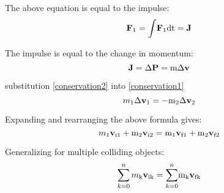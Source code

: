 \documentclass[12pt]{article}
\begin{document}
\noindent
The above equation is equal to the impulse:
\begin{equation*}
\bf{ F}_\text{1} = \textnormal{$\int$}{ F}_\text{1} \textnormal{dt} =  \bf{J}
\end{equation*}

\noindent
The impulse is equal to the change in momentum: 
\begin{equation}
\bf{J}= \textnormal{$\Delta$} P = \textnormal {m} \textnormal{$\Delta$} \bf{ v} \label{conservation2}
\end{equation}

\noindent
substitution \ref{conservation2} into \ref{conservation1} 
\begin{equation*}
m_\text{1}\Delta \bf v_\text{1} = - \textnormal{m}_\text{2} \textnormal{$\Delta$} v_\text{2} 
\end{equation*}

\noindent
Expanding and rearranging the above formula gives:
\begin{equation*}
m_\text{1}\bf{v}_\text{i1} + \textnormal{m}_\text{2}\bf{v}_\text{i2}=\textnormal{m}_\text{1}\bf{v}_\text{f1} + \textnormal{m}_\text{2}\bf{v}_\text{f2}
\end{equation*}

\noindent
Generalizing for multiple colliding objects: 
\begin{equation*}
\sum_{k=0}^{n} m_\text{k}\bf{v}_\text{ik}   = \textnormal{$\sum_{k=0}^{n}$} \textnormal{m}_\text{k}v_\text{fk}
\end{equation*}

~\newline 
\end{document}

